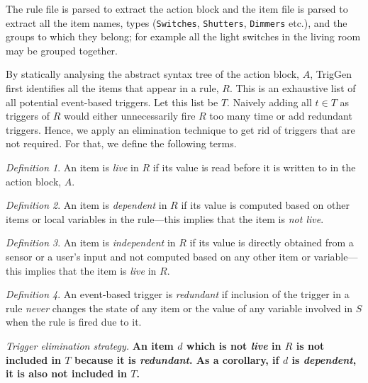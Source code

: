 \documentclass{sig-alternate-05-2015}
\begin{document}
The rule file is parsed to extract the action block and the item file is parsed to extract all the item names, types (\texttt{Switches}, \texttt{Shutters}, \texttt{Dimmers} etc.), and the groups to which they belong; for example all the light switches in the living room may be grouped together.

By statically analysing the abstract syntax tree of the action block, $A$, TrigGen first identifies all the items that appear in a rule, $R$. This is an exhaustive list of all potential event-based triggers. Let this list be $T$.
Naively adding all $t \in T$ as triggers of $R$ would either unnecessarily fire $R$ too many time or add redundant triggers. Hence, we apply an elimination technique to get rid of triggers that are not required. For that, we define the following terms.

\emph{Definition 1}. An item is \emph{live} in $R$ if its value is read before it is written to in the action block, $A$. 

\emph{Definition 2}. An item is \emph{dependent} in $R$ if its value is computed based on other items or local variables in the rule---this implies that the item is \emph{not live}. 
 
\emph{Definition 3}. An item is \emph{independent} in $R$ if  its value is directly obtained from a sensor or a user's input and not computed based on any other item or variable---this implies that the item is \emph{live} in $R$. 

\emph{Definition 4}. An event-based trigger is \emph{redundant} if inclusion of the trigger in a rule \emph{never} changes the state of any item or the value of any variable involved in $S$ when the rule is fired due to it.

\emph{Trigger elimination strategy.} \textbf{ An item $d$ which is not \emph{live} in $R$ is not included in $T$ because it is \emph{redundant}. As a corollary, if $d$ is \emph{dependent}, it is also not included in $T$.} 
\end{document}
